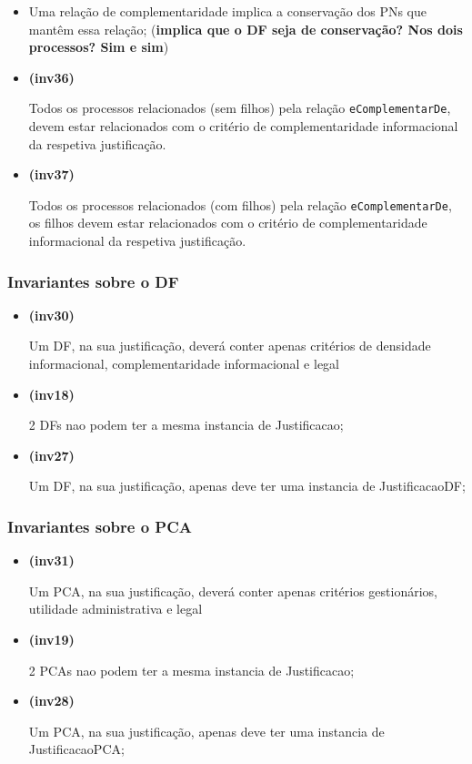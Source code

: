 \documentclass[tikz,runningheads,a4paper]{llncs}
\begin{document}
\begin{subappendices}
\begin{itemize}
\tightlist
\item
  Uma relação de complementaridade implica a conservação dos PNs que
  mantêm essa relação; (\textbf{implica que o DF seja de conservação?
  Nos dois processos? Sim e sim})
\item
  \hypertarget{inv36}{\textbf{(inv36)}} Todos os processos relacionados (sem filhos) pela
  relação \texttt{eComplementarDe}, devem estar relacionados com o
  critério de complementaridade informacional da respetiva justificação.
\item
  \hypertarget{inv37}{\textbf{(inv37)}}Todos os processos relacionados (com filhos) pela
  relação \texttt{eComplementarDe}, os filhos devem estar relacionados
  com o critério de complementaridade informacional da respetiva
  justificação.
\end{itemize}

\hypertarget{invariantes-sobre-o-df}{%
\subsubsection{Invariantes sobre o DF}\label{invariantes-sobre-o-df}}

\begin{itemize}
\tightlist
\item
  \hypertarget{inv30}{\textbf{(inv30)}} Um DF, na sua justificação, deverá conter apenas
  critérios de densidade informacional, complementaridade informacional
  e legal
\item
  \hypertarget{inv18}{\textbf{(inv18)}} 2 DFs nao podem ter a mesma instancia de
  Justificacao;
\item
  \hypertarget{inv27}{\textbf{(inv27)}} Um DF, na sua justificação, apenas deve ter uma
  instancia de JustificacaoDF;
\end{itemize}

\hypertarget{invariantes-sobre-o-pca}{%
\subsubsection{Invariantes sobre o PCA}\label{invariantes-sobre-o-pca}}

\begin{itemize}
\tightlist
\item
  \hypertarget{inv31}{\textbf{(inv31)}} Um PCA, na sua justificação, deverá conter apenas
  critérios gestionários, utilidade administrativa e legal
\item
  \hypertarget{inv19}{\textbf{(inv19)}} 2 PCAs nao podem ter a mesma instancia de
  Justificacao;
\item
  \hypertarget{inv28}{\textbf{(inv28)}} Um PCA, na sua justificação, apenas deve ter uma
  instancia de JustificacaoPCA;
\end{itemize}


\end{subappendices}
\end{document}
